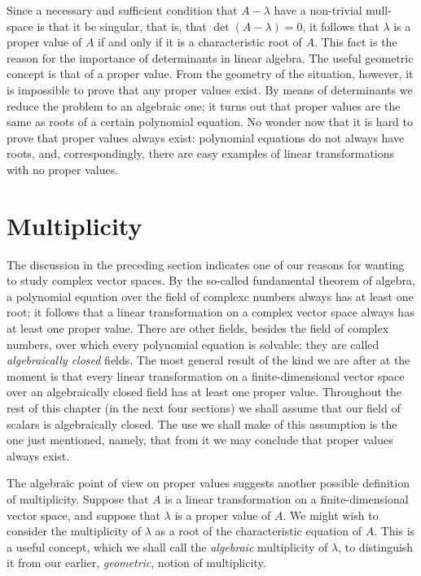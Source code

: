 Since a necessary and sufficient condition that \(A - \lambda\) have a
non-trivial mull-space is that it be singular, that is, that \(\det (A-\lambda)
= 0\), it follows that \(\lambda\) is a proper value of \(A\) if and only if it
is a characteristic root of \(A\). This fact is the reason for the importance of
determinants in linear algebra. The useful geometric concept is that of a proper
value. From the geometry of the situation, however, it is impossible to prove
that any proper values exist. By means of determinants we reduce the problem to
an algebraic one; it turns out that proper values are the same as roots of a
certain polynomial equation. No wonder now that it is hard to prove that proper
values always exist: polynomial equations do not always have roots, and,
correspondingly, there are easy examples of linear transformations with no
proper values.

\section{Multiplicity}

The discussion in the preceding section indicates one of our reasons for wanting
to study complex vector spaces. By the so-called fundamental theorem of algebra,
a polynomial equation over the field of complexc numbers always has at least one
root; it follows that a linear transformation on a complex vector space always
has at least one proper value. There are other fields, besides the field of
complex numbers, over which every polynomial equation is solvable; they are
called \emph{algebraically closed} fields. The most general result of the kind
we are after at the moment is that every linear transformation on a
finite-dimensional vector space over an algebraically closed field has at least
one proper value. Throughout the rest of this chapter (in the next four
sections) we shall assume that our field of scalars is algebraically closed. The
use we shall make of this assumption is the one just mentioned, namely, that
from it we may conclude that proper values always exist.

The algebraic point of view on proper values suggests another possible
definition of multiplicity. Suppose that \(A\) is a linear transformation on a
finite-dimensional vector space, and suppose that \(\lambda\) is a proper value
of \(A\). We might wish to consider the multiplicity of \(\lambda\) as a root of
the characteristic equation of \(A\). This is a useful concept, which we shall
call the \emph{algebraic} multiplicity of \(\lambda\), to distinguish it from
our earlier, \emph{geometric}, notion of multiplicity.



